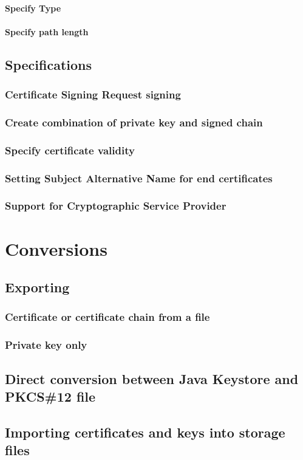 \documentclass[10pt, a4paper]{report}
\begin{document}
      \paragraph{Specify Type}
      
      \paragraph{Specify path length}
      
  \subsection{Specifications}
  
    \subsubsection{Certificate Signing Request signing}
    
    \subsubsection{Create combination of private key and signed chain}
    
    \subsubsection{Specify certificate validity}
    
    \subsubsection{Setting Subject Alternative Name for end certificates}
    
    \subsubsection{Support for Cryptographic Service Provider}
    
\section{Conversions}

  \subsection{Exporting}
  
    \subsubsection{Certificate or certificate chain from a file}
    
    \subsubsection{Private key only}
    
  \subsection{Direct conversion between Java Keystore and PKCS\#12 file}
  
  \subsection{Importing certificates and keys into storage files}
  
\end{document}
